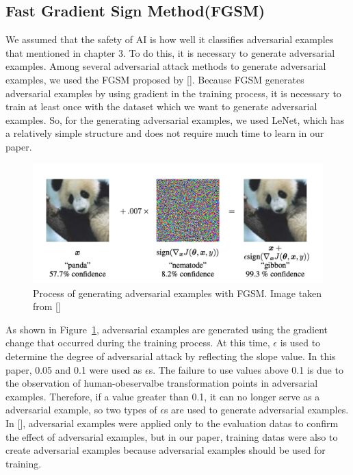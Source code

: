 \documentclass[journal,article,submit,moreauthors,pdftex]{Definitions/mdpi}
\begin{document}
\subsection{Fast Gradient Sign Method(FGSM)}

We assumed that the safety of AI is how well it classifies adversarial examples that mentioned in chapter 3.
To do this, it is necessary to generate adversarial examples. Among several adversarial attack methods to generate adversarial examples, we used the FGSM proposed by [].
Because FGSM generates adversarial examples by using gradient in the training process, it is necessary to train at least once with the dataset which we want to generate adversarial examples.
So, for the generating adversarial examples, we used LeNet, which has a relatively simple structure and does not require much time to learn in our paper.

\begin{figure}[H] 
\includegraphics[width=13cm]{Definitions/fgsm.png}
\caption{Process of generating adversarial examples with FGSM. Image taken from []\label{fgsm}}
\end{figure} 

As shown in Figure~\ref{fgsm}, adversarial examples are generated using the gradient change that occurred during the training process.
At this time, \begin{math}\epsilon\end{math} is used to determine the degree of adversarial attack by reflecting the slope value.
In this paper, 0.05 and 0.1 were used as \begin{math}\epsilon\end{math}s. The failure to use values above 0.1 is due to the observation of human-obeservalbe transformation points in adversarial examples.
Therefore, if a value greater than 0.1, it can no longer serve as a adversarial example, so two types of \begin{math}\epsilon\end{math}s are used to generate adversarial examples.
In [], adversarial examples were applied only to the evaluation datas to confirm the effect of adversarial examples, but in our paper, training datas were also to create adversarial examples because adversarial examples should be used for training.
\end{document}
